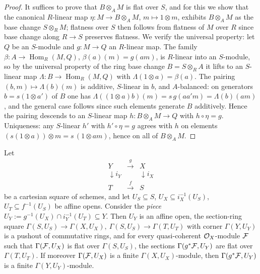 \begin{proof}
  \leanok
  It suffices to prove that \(B \otimes_A M\) is flat over \(S\), and for
  this we show that the canonical \(R\)-linear map
  \(\eta : M \to B \otimes_A M\), \(m \mapsto 1 \otimes m\), exhibits
  \(B \otimes_A M\) as the base change \(S \otimes_R M\); flatness over
  \(S\) then follows from flatness of \(M\) over \(R\) since base change
  along \(R \to S\) preserves flatness.  We verify the universal property:
  let \(Q\) be an \(S\)-module and \(g : M \to Q\) an \(R\)-linear map.  The
  family \(\beta : A \to \operatorname{Hom}_R(M, Q)\),
  \(\beta(a)(m) = g(am)\), is \(R\)-linear into an \(S\)-module, so by the
  universal property of the ring base change \(B = S \otimes_R A\) it lifts
  to an \(S\)-linear map \(\Lambda : B \to \operatorname{Hom}_R(M, Q)\) with
  \(\Lambda(1 \otimes a) = \beta(a)\).  The pairing
  \((b, m) \mapsto \Lambda(b)(m)\) is additive, \(S\)-linear in \(b\), and
  \(A\)-balanced: on generators \(b = s (1 \otimes a')\) of \(B\) one has
  \(\Lambda((1 \otimes a) b)(m) = s\, g(a a' m) = \Lambda(b)(a m)\), and the
  general case follows since such elements generate \(B\) additively.  Hence
  the pairing descends to an \(S\)-linear map
  \(h : B \otimes_A M \to Q\) with \(h \circ \eta = g\).  Uniqueness: any
  \(S\)-linear \(h'\) with \(h' \circ \eta = g\) agrees with \(h\) on
  elements \((s(1 \otimes a)) \otimes m = s\,(1 \otimes am)\), hence on all
  of \(B \otimes_A M\).
\end{proof}

\begin{lemma}

\label{mk-lem:flat_section_pullback_piece}
  \leanok

  Let
  \[
    \begin{array}{ccc}
      Y & \xrightarrow{\;g\;} & X \\
      \downarrow{\scriptstyle i_Y} & & \downarrow{\scriptstyle i_X} \\
      T & \xrightarrow{\;f\;} & S
    \end{array}
  \]
  be a cartesian square of schemes, and let \(U_S \subseteq S\),
  \(U_X \subseteq i_X^{-1}(U_S)\), \(U_T \subseteq f^{-1}(U_S)\) be affine
  opens.  Consider the \emph{piece}
  \(U_Y := g^{-1}(U_X) \cap i_Y^{-1}(U_T) \subseteq Y\).  Then \(U_Y\) is an
  affine open, the section-ring square
  \(\Gamma(S, U_S) \to \Gamma(X, U_X),\ \Gamma(S, U_S) \to \Gamma(T, U_T)\)
  with corner \(\Gamma(Y, U_Y)\) is a pushout of commutative rings, and for
  every quasi-coherent \(\mathcal{O}_X\)-module \(\mathcal{F}\) such that
  \(\Gamma(\mathcal{F}, U_X)\) is flat over \(\Gamma(S, U_S)\), the sections
  \(\Gamma(g^* \mathcal{F}, U_Y)\) are flat over \(\Gamma(T, U_T)\).  If moreover
  \(\Gamma(\mathcal{F}, U_X)\) is a finite \(\Gamma(X, U_X)\)-module, then
  \(\Gamma(g^* \mathcal{F}, U_Y)\) is a finite \(\Gamma(Y, U_Y)\)-module.
\end{lemma}

